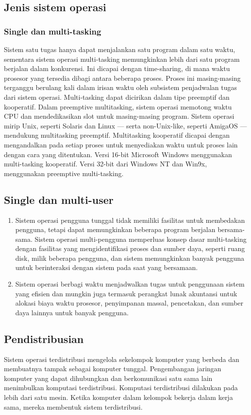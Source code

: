 \subsection{Jenis sistem operasi}
\subsubsection{Single dan multi-tasking}
	\begin{enumerate}
		Sistem satu tugas hanya dapat menjalankan satu program dalam satu waktu, sementara sistem operasi multi-tasking memungkinkan lebih dari satu program berjalan dalam konkurensi. Ini dicapai dengan time-sharing, di mana waktu prosesor yang tersedia dibagi antara beberapa proses. Proses ini masing-masing terganggu berulang kali dalam irisan waktu oleh subsistem penjadwalan tugas dari sistem operasi. Multi-tasking dapat dicirikan dalam tipe preemptif dan kooperatif. Dalam preemptive multitasking, sistem operasi memotong waktu CPU dan mendedikasikan slot untuk masing-masing program. Sistem operasi mirip Unix, seperti Solaris dan Linux — serta non-Unix-like, seperti AmigaOS — mendukung multitasking preemptif. Multitasking kooperatif dicapai dengan mengandalkan pada setiap proses untuk menyediakan waktu untuk proses lain dengan cara yang ditentukan. Versi 16-bit Microsoft Windows menggunakan multi-tasking kooperatif. Versi 32-bit dari Windows NT dan Win9x, menggunakan preemptive multi-tasking.
	\end{enumerate}
\subsection{Single dan multi-user}
	\begin{enumerate}
		\item Sistem operasi pengguna tunggal tidak memiliki fasilitas untuk membedakan pengguna, tetapi dapat memungkinkan beberapa program berjalan bersama-sama. Sistem operasi multi-pengguna memperluas konsep dasar multi-tasking dengan fasilitas yang mengidentifikasi proses dan sumber daya, seperti ruang disk, milik beberapa pengguna, dan sistem memungkinkan banyak pengguna untuk berinteraksi dengan sistem pada saat yang bersamaan. 
		\item Sistem operasi berbagi waktu menjadwalkan tugas untuk penggunaan sistem yang efisien dan mungkin juga termasuk perangkat lunak akuntansi untuk alokasi biaya waktu prosesor, penyimpanan massal, pencetakan, dan sumber daya lainnya untuk banyak pengguna.
	\end{enumerate}
\subsection{Pendistribusian}
	\begin{enumerate}
		Sistem operasi terdistribusi mengelola sekelompok komputer yang berbeda dan membuatnya tampak sebagai komputer tunggal. Pengembangan jaringan komputer yang dapat dihubungkan dan berkomunikasi satu sama lain menimbulkan komputasi terdistribusi. Komputasi terdistribusi dilakukan pada lebih dari satu mesin. Ketika komputer dalam kelompok bekerja dalam kerja sama, mereka membentuk sistem terdistribusi.
	\end{enumerate}
